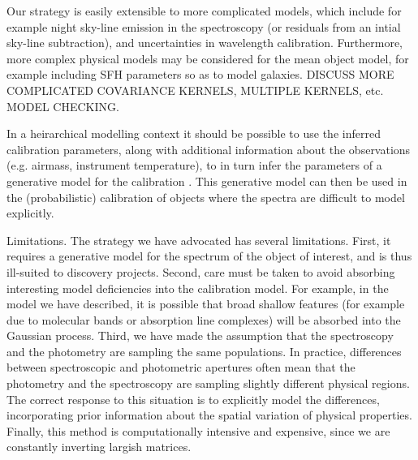 \documentclass[iop,numberedappendix]{emulateapj}
\begin{document}
Our strategy is easily extensible to more complicated models, which
include for example night sky-line emission in the spectroscopy (or
residuals from an intial sky-line subtraction), and uncertainties in
wavelength calibration. Furthermore, more complex physical models may
be considered for the mean object model, for example including SFH
parameters so as to model galaxies.  {\color{blue} DISCUSS MORE
COMPLICATED COVARIANCE KERNELS, MULTIPLE KERNELS, etc.  MODEL
CHECKING.}

In a heirarchical modelling context it should be possible to use the
inferred calibration parameters, along with additional information
about the observations (e.g. airmass, instrument temperature), to in
turn infer the parameters of a generative model for the calibration
\citep[e.g.][]{spectrophot}. This generative model can then be used in
the (probabilistic) calibration of objects where the spectra are
difficult to model explicitly.

Limitations.  The strategy we have advocated has several limitations.
First, it requires a generative model for the spectrum of the object
of interest, and is thus ill-suited to discovery projects.  Second,
care must be taken to avoid absorbing interesting model deficiencies
into the calibration model. For example, in the model we have
described, it is possible that broad shallow features (for example due
to molecular bands or absorption line complexes) will be absorbed into
the Gaussian process. Third, we have made the assumption that the
spectroscopy and the photometry are sampling the same populations.  In
practice, differences between spectroscopic and photometric apertures
often mean that the photometry and the spectroscopy are sampling
slightly different physical regions.  The correct response to this
situation is to explicitly model the differences, incorporating prior
information about the spatial variation of physical properties.
Finally, this method is computationally intensive and expensive, since
we are constantly inverting largish matrices.

\end{document}
